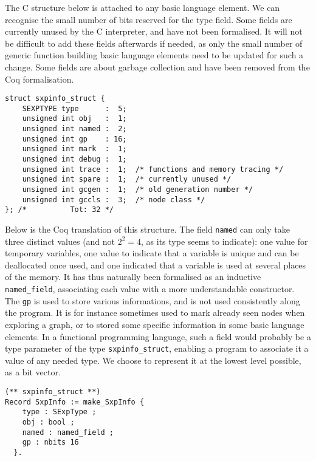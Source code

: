 \documentclass{article}
\newcommand\Coq{Coq}
\newcommand\Cn{C}
\begin{document}
The \Cn{} structure below is attached to any
basic language element.
We can recognise the small number of bits reserved for the type field.
Some fields are currently unused by the \Cn{} interpreter,
and have not been formalised.
It will not be difficult to add these fields afterwards if needed,
as only the small number of generic function building
basic language elements need to be updated for such a change.
Some fields are about garbage collection
and have been removed from the \Coq{} formalisation.
\begin{verbatim}
struct sxpinfo_struct {
    SEXPTYPE type      :  5;
    unsigned int obj   :  1;
    unsigned int named :  2;
    unsigned int gp    : 16;
    unsigned int mark  :  1;
    unsigned int debug :  1;
    unsigned int trace :  1;  /* functions and memory tracing */
    unsigned int spare :  1;  /* currently unused */
    unsigned int gcgen :  1;  /* old generation number */
    unsigned int gccls :  3;  /* node class */
}; /*          Tot: 32 */
\end{verbatim}
Below is the \Coq{} translation of this structure.
The field \texttt{named} can only take three distinct values
(and not \(2^2 = 4\), as its type seems to indicate):
one value for temporary variables,
one value to indicate that a variable is unique
and can be deallocated once used,
and one indicated that a variable is used at several places of the memory.
It has thus naturally been formalised as an inductive \texttt{named_field},
associating each value with a more understandable constructor.
%
The \texttt{gp} is used to store various informations,
and is not used consistently along the program.
It is for instance sometimes used to mark already seen nodes
when exploring a graph,
or to stored some specific information in some basic language elements.
In a functional programming language,
such a field would probably be a type parameter of the type
\texttt{sxpinfo_struct}, enabling a program to associate
it a value of any needed type.
We choose to represent it at the lowest level possible,
as a bit vector.
\begin{verbatim}
(** sxpinfo_struct **)
Record SxpInfo := make_SxpInfo {
    type : SExpType ;
    obj : bool ;
    named : named_field ;
    gp : nbits 16
  }.
\end{verbatim}
\end{document}
